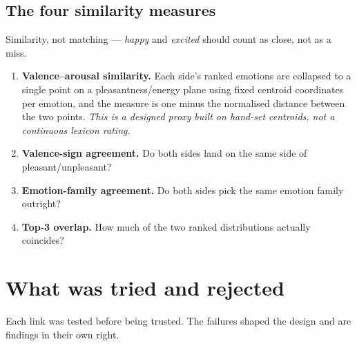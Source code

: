 \documentclass[11pt,a4paper]{article}
\newcommand{\say}[1]{\textit{\color{soft}#1}}
\begin{document}
\subsection{The four similarity measures}

Similarity, not matching --- \say{happy} and \say{excited} should count as close, not as a miss.

\begin{enumerate}
\item \textbf{Valence--arousal similarity.} Each side's ranked emotions are collapsed to a single
point on a pleasantness/energy plane using fixed centroid coordinates per emotion, and the measure is
one minus the normalised distance between the two points. \emph{This is a designed proxy built on
hand-set centroids, not a continuous lexicon rating.}
\item \textbf{Valence-sign agreement.} Do both sides land on the same side of pleasant/unpleasant?
\item \textbf{Emotion-family agreement.} Do both sides pick the same emotion family outright?
\item \textbf{Top-3 overlap.} How much of the two ranked distributions actually coincides?
\end{enumerate}

\section{What was tried and rejected}

Each link was tested before being trusted. The failures shaped the design and are findings in their
own right.
\end{document}
